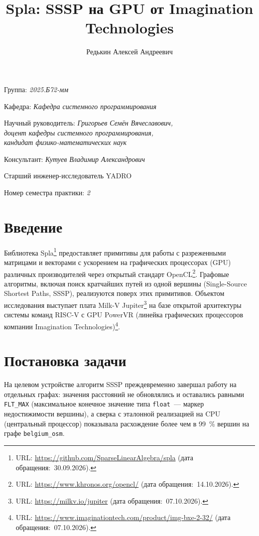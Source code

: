 \documentclass[a4paper]{article}
\title{Spla: SSSP на GPU от Imagination Technologies}
\author{Редькин Алексей Андреевич}
\date{}
\begin{document}
\maketitle

\begin{flushright}
    Группа: \emph{2025.Б72-мм}

    Кафедра: \emph{Кафедра системного программирования}

    Научный руководитель: \emph{Григорьев Семён Вячеславович,}\\
    \emph{доцент кафедры системного программирования,}\\
    \emph{кандидат физико-математических наук}

    Консультант: \emph{Кутуев Владимир Александрович}

    Старший инженер-исследователь YADRO

    Номер семестра практики: \emph{2}
\end{flushright}

\section{Введение}

Библиотека Spla\footnote{URL: \url{https://github.com/SparseLinearAlgebra/spla} (дата обращения:~30.09.2026).} предоставляет примитивы для работы с разреженными матрицами и векторами с ускорением на графических процессорах (GPU) различных производителей через открытый стандарт OpenCL\footnote{URL: \url{https://www.khronos.org/opencl/} (дата обращения:~14.10.2026).}. Графовые алгоритмы, включая поиск кратчайших путей из одной вершины (Single-Source Shortest Paths, SSSP), реализуются поверх этих примитивов. Объектом исследования выступает плата Milk-V Jupiter\footnote{URL: \url{https://milkv.io/jupiter} (дата обращения:~07.10.2026).} на базе открытой архитектуры системы команд RISC-V с GPU PowerVR (линейка графических процессоров компании Imagination Technologies)\footnote{URL: \url{https://www.imaginationtech.com/product/img-bxe-2-32/} (дата обращения:~07.10.2026).}.

\section{Постановка задачи}

На целевом устройстве алгоритм SSSP преждевременно завершал работу на отдельных графах: значения расстояний не обновлялись и оставались равными \texttt{FLT\_MAX} (максимальное конечное значение типа \texttt{float}~--- маркер недостижимости вершины), а сверка с эталонной реализацией на CPU (центральный процессор) показывала расхождение более чем в 99~\% вершин на графе \texttt{belgium\_osm}.
\end{document}
